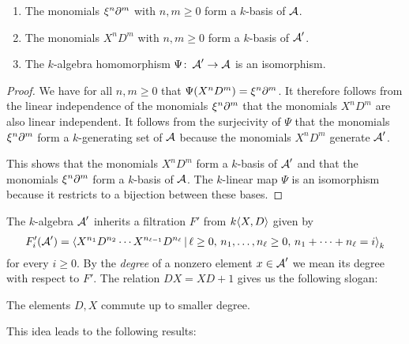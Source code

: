\begin{corollary}
  \label{corollary: monomials are basis of weyl algebra}
  \leavevmode
  \begin{enumerate}
    \item
      The monomials $\xi^n \partial^m$ with $n, m \geq 0$ form a $k$-basis of $\operatorname{\mathcal{A}}$.
    \item
      The monomials $X^n D^m$ with $n, m \geq 0$ form a $k$-basis of $\operatorname{\mathcal{A}}'$.
    \item
      The $k$-algebra homomorphism $\Psi \colon \operatorname{\mathcal{A}}' \to \operatorname{\mathcal{A}}$ is an isomorphism.
  \end{enumerate}
\end{corollary}


\begin{proof}
  We have for all $n, m \geq 0$ that $\Psi(X^n D^m) = \xi^n \partial^m$.
  It therefore follows from the linear independence of the monomials $\xi^n \partial^m$ that the monomials $X^n D^m$ are also linear independent.
  It follows from the surjecivity of $\Psi$ that the monomials $\xi^n \partial^m$ form a $k$-generating set of $\operatorname{\mathcal{A}}$ because the monomials $X^n D^m$ generate $\operatorname{\mathcal{A}}'$.
  
  This shows that the monomials $X^n D^m$ form a $k$-basis of $\operatorname{\mathcal{A}}'$ and that the monomials $\xi^n \partial^m$ form a $k$-basis of $\operatorname{\mathcal{A}}$.
  The $k$-linear map $\Psi$ is an isomorphism because it restricts to a bijection between these bases.
\end{proof}


\begin{fluff}
  The $k$-algebra $\operatorname{\mathcal{A}}'$ inherits a filtration $F'$ from $k\langle X,D \rangle$ given by
  \begin{equation}
    \label{equation: filtration of Weyl via quotient}
      F'_i(\weyl')
    = \gen{
        X^{n_1} D^{n_2} \dotsm X^{n_{\ell-1}} D^{n_\ell}
      \suchthat
        \ell \geq 0, \,
        n_1, \dotsc, n_\ell \geq 0, \,
        n_1 + \dotsb + n_\ell = i
      }_k
  \end{equation}
  for every $i \geq 0$.
  By the \emph{degree} of a nonzero element $x \in \operatorname{\mathcal{A}}'$ we mean its degree with respect to $F'$.
  The relation $D X = X D + 1$ gives us the following slogan:
  \begin{center}
    The elements $D, X$ commute up to smaller degree.
  \end{center}
  This idea leads to the following results:
\end{fluff}


